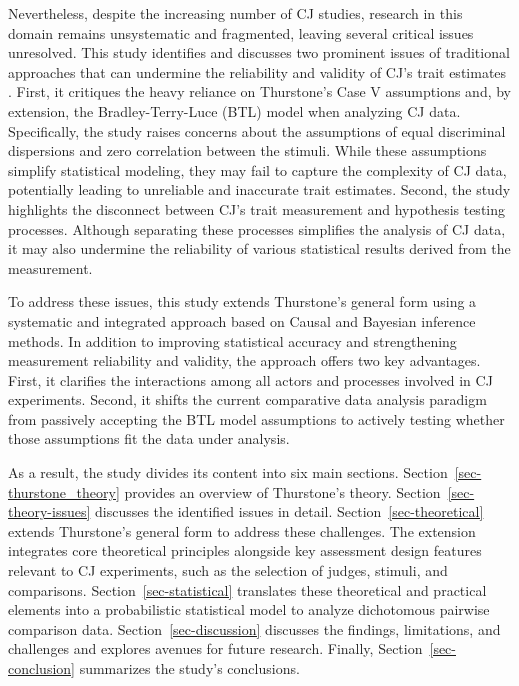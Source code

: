 \documentclass[
  authoryear,
  review,
  1p]{elsarticle}
\begin{document}
Nevertheless, despite the increasing number of CJ studies, research in
this domain remains unsystematic and fragmented, leaving several
critical issues unresolved. This study identifies and discusses two
prominent issues of traditional approaches that can undermine the
reliability and validity of CJ's trait estimates
\citep[pp.~2]{Perron_et_al_2015}. First, it critiques the heavy reliance
on Thurstone's Case V assumptions \citep{Thurstone_1927b} and, by
extension, the Bradley-Terry-Luce (BTL) model
\citep{Bradley_et_al_1952, Luce_1959} when analyzing CJ data.
Specifically, the study raises concerns about the assumptions of equal
discriminal dispersions and zero correlation between the stimuli. While
these assumptions simplify statistical modeling, they may fail to
capture the complexity of CJ data, potentially leading to unreliable and
inaccurate trait estimates. Second, the study highlights the disconnect
between CJ's trait measurement and hypothesis testing processes.
Although separating these processes simplifies the analysis of CJ data,
it may also undermine the reliability of various statistical results
derived from the measurement.

To address these issues, this study extends Thurstone's general form
using a systematic and integrated approach based on Causal and Bayesian
inference methods. In addition to improving statistical accuracy and
strengthening measurement reliability and validity, the approach offers
two key advantages. First, it clarifies the interactions among all
actors and processes involved in CJ experiments. Second, it shifts the
current comparative data analysis paradigm from passively accepting the
BTL model assumptions to actively testing whether those assumptions fit
the data under analysis.

As a result, the study divides its content into six main sections.
Section~\ref{sec-thurstone_theory} provides an overview of Thurstone's
theory. Section~\ref{sec-theory-issues} discusses the identified issues
in detail. Section~\ref{sec-theoretical} extends Thurstone's general
form to address these challenges. The extension integrates core
theoretical principles alongside key assessment design features relevant
to CJ experiments, such as the selection of judges, stimuli, and
comparisons. Section~\ref{sec-statistical} translates these theoretical
and practical elements into a probabilistic statistical model to analyze
dichotomous pairwise comparison data. Section~\ref{sec-discussion}
discusses the findings, limitations, and challenges and explores avenues
for future research. Finally, Section~\ref{sec-conclusion} summarizes
the study's conclusions.
\end{document}
